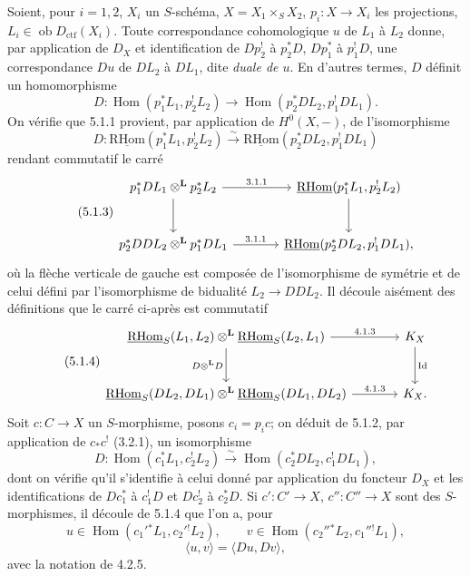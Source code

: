\documentclass[11pt]{article}
\DeclareMathOperator{\Hom}{Hom}
\providecommand{\RHom}{\mathrm{RHom}}
\providecommand{\uRHom}{\underline{\RHom}}
\providecommand{\RHom}{\mathrm{RHom}}
\providecommand{\Hom}{\operatorname{Hom}}
\providecommand{\RHom}{\mathrm R\mathcal{H}om}
\providecommand{\RHom}{\mathrm{RHom}}
\providecommand{\Hom}{\operatorname{Hom}}
\begin{document}
Soient, pour $i=1,2$, $X_i$ un $S$-schéma, $X=X_1\times_S X_2$, $p_i:X\to X_i$ les projections, $L_i\in\operatorname{ob}D_{\mathrm{ctf}}(X_i)$. Toute correspondance cohomologique $u$ de $L_1$ à $L_2$ donne, par application de $D_X$ et identification de $Dp_2^!$ à $p_2^*D$, $Dp_1^*$ à $p_1^!D$, une correspondance $Du$ de $DL_2$ à $DL_1$, dite \emph{duale de $u$}. En d'autres termes, $D$ définit un homomorphisme
\begin{equation}
\tag{5.1.1}
D:\Hom(p_1^*L_1,p_2^!L_2)\longrightarrow \Hom(p_2^*DL_2,p_1^!DL_1).
\end{equation}
On vérifie que 5.1.1 provient, par application de $H^0(X,-)$, de l'isomorphisme
\begin{equation}
\tag{5.1.2}
D:\uRHom(p_1^*L_1,p_2^!L_2)\xrightarrow{\sim}\uRHom(p_2^*DL_2,p_1^!DL_1)
\end{equation}
rendant commutatif le carré
\begin{equation}
\tag{5.1.3}
\begin{tikzcd}[column sep=large,row sep=large]
p_1^*DL_1\otimes^{\mathbf L}p_2^*L_2 \arrow[r,"3.1.1"] \arrow[d]
& \uRHom(p_1^*L_1,p_2^!L_2) \arrow[d] \\
p_2^*DDL_2\otimes^{\mathbf L}p_1^*DL_1 \arrow[r,"3.1.1"]
& \uRHom(p_2^*DL_2,p_1^!DL_1),
\end{tikzcd}
\end{equation}
où la flèche verticale de gauche est composée de l'isomorphisme de symétrie et de celui défini par l'isomorphisme de bidualité $L_2\to DDL_2$. Il découle aisément des définitions que le carré ci-après est commutatif
\begin{equation}
\tag{5.1.4}
\begin{tikzcd}[column sep=large,row sep=large]
\uRHom_S(L_1,L_2)\otimes^{\mathbf L}\uRHom_S(L_2,L_1) \arrow[r,"4.1.3"] \arrow[d,"D\otimes^{\mathbf L} D"']
& K_X \arrow[d,"\operatorname{Id}"] \\
\uRHom_S(DL_2,DL_1)\otimes^{\mathbf L}\uRHom_S(DL_1,DL_2) \arrow[r,"4.1.3"]
& K_X.
\end{tikzcd}
\end{equation}
Soit $c:C\to X$ un $S$-morphisme, posons $c_i=p_ic$; on déduit de 5.1.2, par application de $c_*c^!$ (3.2.1), un isomorphisme
\begin{equation}
\tag{5.1.5}
D:\Hom(c_1^*L_1,c_2^!L_2)\xrightarrow{\sim}\Hom(c_2^*DL_2,c_1^!DL_1),
\end{equation}
dont on vérifie qu'il s'identifie à celui donné par application du foncteur $D_X$ et les identifications de $Dc_1^*$ à $c_1^!D$ et $Dc_2^!$ à $c_2^*D$. Si $c':C'\to X$, $c'':C''\to X$ sont des $S$-morphismes, il découle de 5.1.4 que l'on a, pour
\[
u\in\Hom(c_1'{}^*L_1,c_2'{}^!L_2),\qquad v\in\Hom(c_2''{}^*L_2,c_1''{}^!L_1),\]
\begin{equation}
\tag{5.1.6}
\langle u,v\rangle=\langle Du,Dv\rangle,
\end{equation}
avec la notation de 4.2.5.
\end{document}
